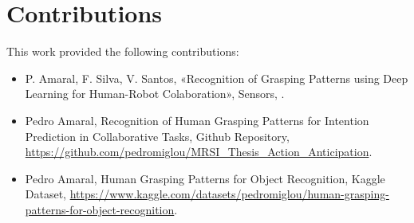 \section{Contributions}

This work provided the following contributions:


\begin{itemize}
    \item P. Amaral, F. Silva, V. Santos, «Recognition of Grasping Patterns using Deep Learning for Human-Robot Colaboration», Sensors, \cite{Amaral2023}.
    \item Pedro Amaral, Recognition of Human Grasping Patterns for Intention Prediction in Collaborative Tasks, Github Repository, \url{https://github.com/pedromiglou/MRSI_Thesis_Action_Anticipation}.
    \item Pedro Amaral, Human Grasping Patterns for Object Recognition, Kaggle Dataset, \url{https://www.kaggle.com/datasets/pedromiglou/human-grasping-patterns-for-object-recognition}.
\end{itemize}
